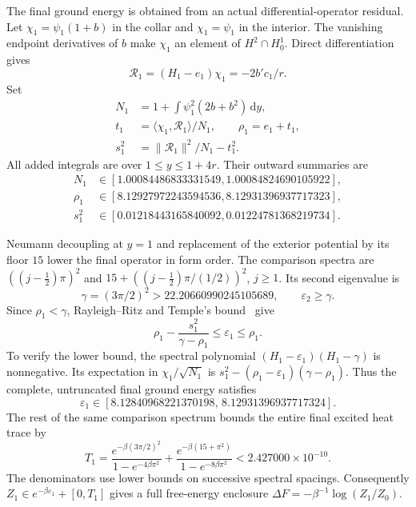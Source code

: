 \documentclass[aps,pra,reprint,superscriptaddress,longbibliography]{revtex4-2}
\newcommand{\dd}{\mathrm d}
\begin{document}
The final ground energy is obtained from an actual differential-operator
residual.  Let $\chi_1=\psi_1(1+b)$ in the collar and $\chi_1=\psi_1$
in the interior.  The vanishing endpoint derivatives of $b$ make
$\chi_1$ an element of $H^2\cap H_0^1$.  Direct differentiation gives
\begin{equation}
 \mathcal R_1=(H_1-e_1)\chi_1=-2b'c_1/r.
 \label{eq:nc-residual}
\end{equation}
Set
\begin{align}
 N_1&=1+\int\psi_1^2(2b+b^2)\,\dd y,\nonumber\\
 t_1&=\langle\chi_1,\mathcal R_1\rangle/N_1,\qquad
 \rho_1=e_1+t_1,\nonumber\\
 s_1^2&=\|\mathcal R_1\|^2/N_1-t_1^2.
 \label{eq:nc-trial}
\end{align}
All added integrals are over $1\le y\le1+4r$.
Their outward summaries are
\begin{align}
 N_1&\in[1.00084486833331549,1.00084824690105922],\nonumber\\
 \rho_1&\in[8.12927972243594536,8.12931396937717323],\nonumber\\
 s_1^2&\in[0.01218443165840092,0.01224781368219734].
 \label{eq:nc-trial-values}
\end{align}

Neumann decoupling at $y=1$ and replacement of the exterior potential
by its floor $15$ lower the final operator in form order.
The comparison spectra are $((j-\tfrac12)\pi)^2$ and
$15+((j-\tfrac12)\pi/(1/2))^2$, $j\ge1$.  Its second eigenvalue is
\begin{equation}
 \gamma=(3\pi/2)^2>22.20660990245105689,
 \qquad \varepsilon_2\ge\gamma.
 \label{eq:nc-gamma}
\end{equation}
Since $\rho_1<\gamma$, Rayleigh--Ritz and Temple's bound~\cite{Temple} give
\begin{equation}
 \rho_1-\frac{s_1^2}{\gamma-\rho_1}
 \le\varepsilon_1\le\rho_1.
 \label{eq:nc-temple}
\end{equation}
To verify the lower bound, the spectral polynomial
$(H_1-\varepsilon_1)(H_1-\gamma)$ is nonnegative.
Its expectation in $\chi_1/\sqrt{N_1}$ is
$s_1^2-(\rho_1-\varepsilon_1)(\gamma-\rho_1)$.
Thus the complete, untruncated final ground energy satisfies
\begin{equation}
 \varepsilon_1\in
 [8.12840968221370198,\,8.12931396937717324].
 \label{eq:nc-final-ground}
\end{equation}
The rest of the same comparison spectrum bounds the entire final
excited heat trace by
\begin{equation}
 T_1=
 \frac{e^{-\beta(3\pi/2)^2}}{1-e^{-4\beta\pi^2}}
 +\frac{e^{-\beta(15+\pi^2)}}{1-e^{-8\beta\pi^2}}
 <2.427000\times10^{-10}.
 \label{eq:nc-final-tail}
\end{equation}
The denominators use lower bounds on successive spectral spacings.
Consequently $Z_1\in e^{-\beta\varepsilon_1}+[0,T_1]$ gives a full
free-energy enclosure $\Delta F=-\beta^{-1}\log(Z_1/Z_0)$.
\end{document}
